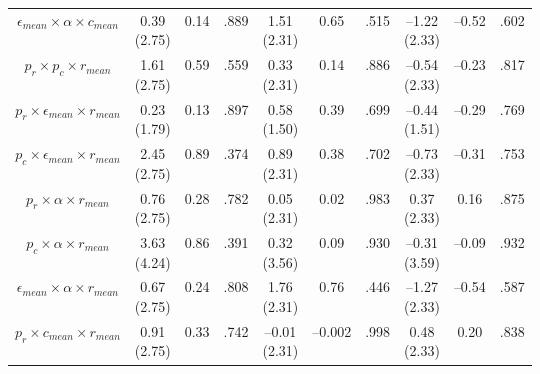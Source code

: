 \documentclass[
  11pt,
]{article}
\begin{document}
\begin{landscape}
\begin{ThreePartTable}
\begin{longtable}[t]{cccccccccc}
$\epsilon_{mean} \times \alpha \times c_{mean}$ & \makecell[c]{0.39\\(2.75)} & 0.14 & .889 & \makecell[c]{1.51\\(2.31)} & 0.65 & .515 & \makecell[c]{–1.22\\(2.33)} & –0.52 & .602\\
$p_r \times p_c \times r_{mean}$ & \makecell[c]{1.61\\(2.75)} & 0.59 & .559 & \makecell[c]{0.33\\(2.31)} & 0.14 & .886 & \makecell[c]{–0.54\\(2.33)} & –0.23 & .817\\
$p_r \times \epsilon_{mean} \times r_{mean}$ & \makecell[c]{0.23\\(1.79)} & 0.13 & .897 & \makecell[c]{0.58\\(1.50)} & 0.39 & .699 & \makecell[c]{–0.44\\(1.51)} & –0.29 & .769\\
$p_c \times \epsilon_{mean} \times r_{mean}$ & \makecell[c]{2.45\\(2.75)} & 0.89 & .374 & \makecell[c]{0.89\\(2.31)} & 0.38 & .702 & \makecell[c]{–0.73\\(2.33)} & –0.31 & .753\\
\addlinespace
$p_r \times \alpha \times r_{mean}$ & \makecell[c]{0.76\\(2.75)} & 0.28 & .782 & \makecell[c]{0.05\\(2.31)} & 0.02 & .983 & \makecell[c]{0.37\\(2.33)} & 0.16 & .875\\
$p_c \times \alpha \times r_{mean}$ & \makecell[c]{3.63\\(4.24)} & 0.86 & .391 & \makecell[c]{0.32\\(3.56)} & 0.09 & .930 & \makecell[c]{–0.31\\(3.59)} & –0.09 & .932\\
$\epsilon_{mean} \times \alpha \times r_{mean}$ & \makecell[c]{0.67\\(2.75)} & 0.24 & .808 & \makecell[c]{1.76\\(2.31)} & 0.76 & .446 & \makecell[c]{–1.27\\(2.33)} & –0.54 & .587\\
$p_r \times c_{mean} \times r_{mean}$ & \makecell[c]{0.91\\(2.75)} & 0.33 & .742 & \makecell[c]{–0.01\\(2.31)} & –0.002 & .998 & \makecell[c]{0.48\\(2.33)} & 0.20 & .838\\

\end{longtable}
\end{ThreePartTable}
\end{landscape}
\end{document}
